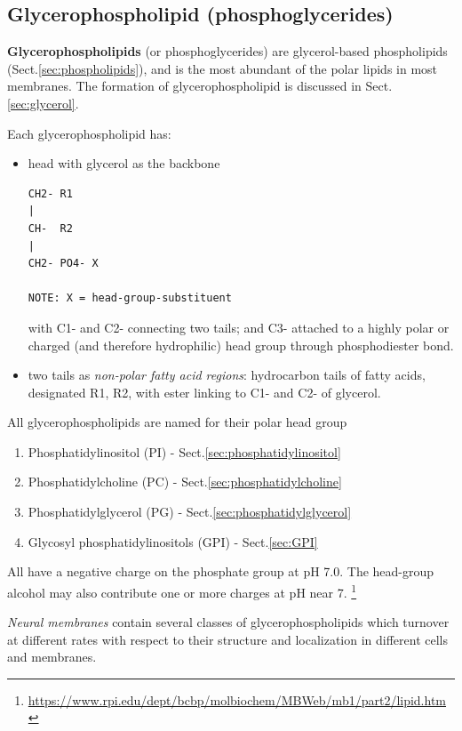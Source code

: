 \subsection{Glycerophospholipid (phosphoglycerides)}
\label{sec:glycerophospholipid}
\label{sec:phosphoglycerides}

{\bf Glycerophospholipids} (or phosphoglycerides) are glycerol-based
phospholipids (Sect.\ref{sec:phospholipids}), and is the most abundant of the
polar lipids in most membranes. The formation of glycerophospholipid is
discussed in Sect.\ref{sec:glycerol}.

Each glycerophospholipid has:
\begin{itemize}
  \item head with glycerol as the backbone 
  
\begin{verbatim}
CH2- R1
|
CH-  R2
|
CH2- PO4- X 

NOTE: X = head-group-substituent
\end{verbatim}
with C1- and C2- connecting two tails; and C3- attached to a highly polar or
charged (and therefore hydrophilic) head group through phosphodiester bond. 
  
  \item two tails as {\it non-polar fatty acid regions}:
  hydrocarbon tails of fatty acids, designated R1, R2, with ester linking to
  C1- and C2- of glycerol.
\end{itemize}


All glycerophospholipids are named for their polar head group
\begin{enumerate}
  \item Phosphatidylinositol (PI) - Sect.\ref{sec:phosphatidylinositol}
  \item Phosphatidylcholine (PC) - Sect.\ref{sec:phosphatidylcholine}
  \item Phosphatidylglycerol (PG) - Sect.\ref{sec:phosphatidylglycerol}
  \item Glycosyl phosphatidylinositols (GPI) - Sect.\ref{sec:GPI}
\end{enumerate}
All have a negative charge on the phosphate group at pH 7.0. The head-group
alcohol may also contribute one or more charges at pH near 7.
\footnote{\url{https://www.rpi.edu/dept/bcbp/molbiochem/MBWeb/mb1/part2/lipid.htm}}

{\it Neural membranes} contain several classes of glycerophospholipids which
turnover at different rates with respect to their structure and localization in
different cells and membranes.


